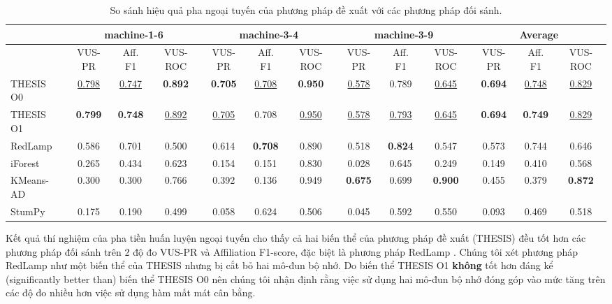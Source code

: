 \begin{table}[htbp]
\centering
\caption{So sánh hiệu quả pha ngoại tuyến của phương pháp đề xuất với các phương pháp đối sánh.}
\label{tab:smd-window-counts}
\scriptsize
\setlength{\tabcolsep}{2.5pt}
\begin{adjustbox}{max width=\textwidth}
\begin{tabular}{lcccccccccccc}
\toprule
\multirow{2}{*}{{}} & \multicolumn{3}{c}{machine-1-6} & \multicolumn{3}{c}{machine-3-4} & \multicolumn{3}{c}{machine-3-9} & \multicolumn{3}{c}{Average} \\
\midrule
{} & VUS-PR & Aff. F1 & VUS-ROC & VUS-PR & Aff. F1 & VUS-ROC & VUS-PR & Aff. F1 & VUS-ROC & VUS-PR & Aff. F1 & VUS-ROC \\
THESIS O0 & \underline{0.798} & \underline{0.747} & \textbf{0.892} & \textbf{0.705} & \underline{0.708} & \textbf{0.950} & \underline{0.578} & 0.789 & \underline{0.645} & \textbf{0.694} & \underline{0.748} & \underline{0.829} \\
THESIS O1 & \textbf{0.799} & \textbf{0.748} & \underline{0.892} & \underline{0.705} & 0.708 & \underline{0.950} & \underline{0.578} & \underline{0.793} & \underline{0.645} & \textbf{0.694} & \textbf{0.749} & \underline{0.829} \\
RedLamp & 0.586 & 0.701 & 0.500 & 0.614 & \textbf{0.708} & 0.890 & 0.518 & \textbf{0.824} & 0.547 & 0.573 & 0.744 & 0.646 \\
iForest & 0.265 & 0.434 & 0.623 & 0.154 & 0.151 & 0.830 & 0.028 & 0.645 & 0.249 & 0.149 & 0.410 & 0.568 \\
KMeans-AD & 0.300 & 0.300 & 0.766 & 0.392 & 0.136 & 0.949 & \textbf{0.675} & 0.699 & \textbf{0.900} & 0.455 & 0.379 & \textbf{0.872} \\
StumPy & 0.175 & 0.190 & 0.499 & 0.058 & 0.624 & 0.506 & 0.045 & 0.592 & 0.550 & 0.093 & 0.469 & 0.518 \\
\bottomrule
\end{tabular}
\end{adjustbox}
\end{table}

Kết quả thí nghiệm của pha tiền huấn luyện ngoại tuyến cho thấy cả hai biến thể của phương pháp đề xuất (THESIS) đều tốt hơn các phương pháp đối sánh trên 2 độ đo VUS-PR và Affiliation F1-score, đặc biệt là phương pháp RedLamp \cite{10.1145/3711896.3737110}. Chúng tôi xét phương pháp RedLamp như một biến thể của THESIS nhưng bị cắt bỏ hai mô-đun bộ nhớ. Do biến thể THESIS O1 \textbf{không} tốt hơn đáng kể (significantly better than) biến thể THESIS O0 nên chúng tôi nhận định rằng việc sử dụng hai mô-đun bộ nhớ đóng góp vào mức tăng trên các độ đo nhiều hơn việc sử dụng hàm mất mát cân bằng.

